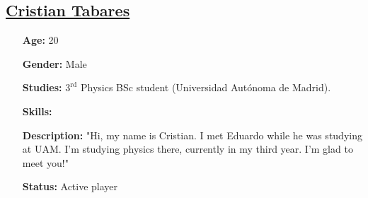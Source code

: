 \documentclass[english,11pt]{article}
\theoremstyle{definition}
\theoremstyle{plain}
\begin{document}
\subsection*{\underline{Cristian Tabares}}
\begin{itemize}
\item[\textbf{Age:}] 20
\item[\textbf{Gender:}] Male
\item[\textbf{Studies:}] $3^\text{rd}$ Physics BSc student (Universidad Autónoma de Madrid).
\item[\textbf{Skills:}] 
\item[\textbf{Description:}] "Hi, my name is Cristian. I met Eduardo while he was studying at UAM. I'm studying physics there, currently in my third year. I'm glad to meet you!"
\item[\textbf{Status:}] Active player
\end{itemize}
\end{document}
